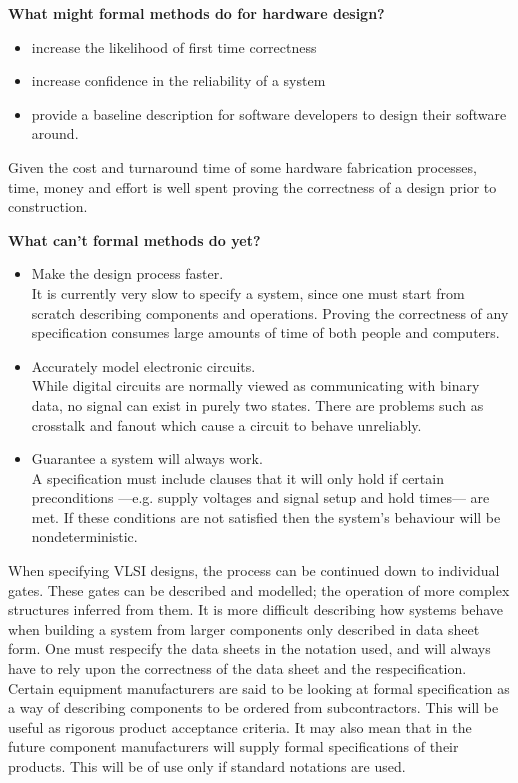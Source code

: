 {\samepage
{\bf What might formal methods do for hardware design?}
\begin{itemize}
\item increase the likelihood of first time correctness
\item increase confidence in the reliability of a system
\item provide a baseline description for software developers to design their software around.
\end{itemize}
Given the cost and turnaround time of some hardware fabrication processes, time, money and effort  is well spent proving the correctness of a design prior to construction.
}

{\bf What can't formal methods   do yet?}
\begin{itemize}
\item
Make the design process faster. \\
It is currently very slow to specify a system, since one must start from scratch describing components and operations. Proving the correctness of any specification consumes large amounts of   time of both people and computers.
\item Accurately model electronic circuits.\\
While digital circuits are normally viewed as communicating with binary data, no signal can exist in purely two states. 
There are problems such as crosstalk and fanout which  cause a circuit to behave unreliably.
\item
Guarantee a system will always work.\\
A specification must include clauses that it will only hold if certain preconditions ---e.g. supply voltages and signal setup and hold times--- are met.
If these conditions are not satisfied then the system's  behaviour will be nondeterministic.
\end{itemize}
When specifying VLSI designs, the process can be continued down to individual gates. 
These gates  can be   described and modelled; the operation of more complex structures inferred from them.
It is more difficult describing how systems behave when  building a system from larger components only described in data sheet form. 
One must respecify the data sheets in the notation  used, and will always have to rely upon the correctness of the data sheet and the respecification.
Certain equipment manufacturers are said to be looking at formal specification as a way of describing components to be ordered from subcontractors. 
This will be useful as rigorous product acceptance criteria. 
It may also mean that in the future component manufacturers will supply formal specifications of their products.
This will be of use only if standard notations are used.


